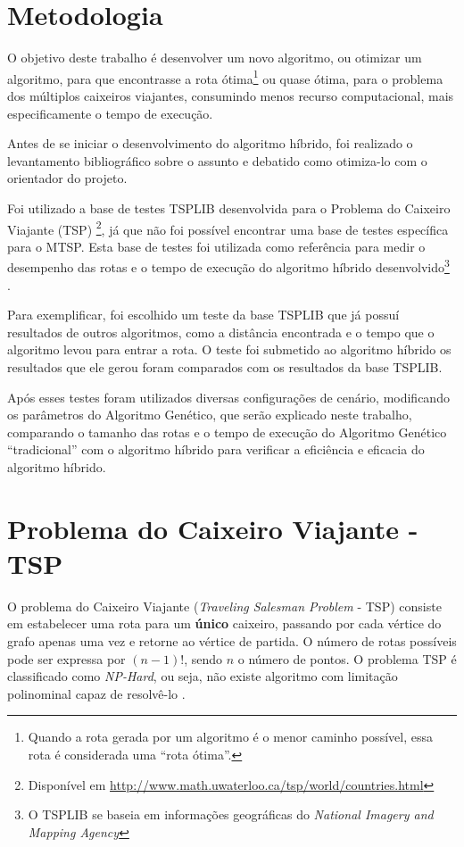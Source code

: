 \documentclass{abnt}
\begin{document}
	\chapter{Metodologia}

		O objetivo deste trabalho é desenvolver um novo algoritmo, ou otimizar um algoritmo, para que encontrasse a rota ótima\footnote{Quando a rota gerada por um algoritmo é o menor caminho possível, essa rota é considerada uma ``rota ótima''.} ou quase ótima, para o problema dos múltiplos caixeiros viajantes, consumindo menos recurso computacional, mais especificamente o tempo de execução. 

		Antes de se iniciar o desenvolvimento do algoritmo híbrido, foi realizado o levantamento bibliográfico sobre o assunto e debatido como otimiza-lo com o orientador do projeto.

		Foi utilizado a base de testes TSPLIB desenvolvida para o Problema do Caixeiro Viajante (TSP) \footnote{Disponível em \url{http://www.math.uwaterloo.ca/tsp/world/countries.html}}, já que não foi possível encontrar uma base de testes específica para o MTSP. Esta base de testes foi utilizada como referência para medir o desempenho das rotas e o tempo de execução do algoritmo híbrido desenvolvido\footnote{O TSPLIB se baseia em informações geográficas do \textit{National Imagery and Mapping Agency}} \cite{tsplib}.

		Para exemplificar, foi escolhido um teste da base TSPLIB que já possuí resultados de outros algoritmos, como a distância encontrada e o tempo que o algoritmo levou para entrar a rota. O teste foi submetido ao algoritmo híbrido os resultados que ele gerou foram comparados com os resultados da base TSPLIB.

		Após esses testes foram utilizados diversas configurações de cenário, modificando os parâmetros do Algoritmo Genético, que serão explicado neste trabalho, comparando o tamanho das rotas e o tempo de execução do Algoritmo Genético ``tradicional'' com o algoritmo híbrido para verificar a eficiência e eficacia do algoritmo híbrido. 

	
	\chapter{Problema do Caixeiro Viajante - TSP}
		O problema do Caixeiro Viajante (\textit{Traveling Salesman Problem} - TSP) consiste em estabelecer uma rota para um \textbf{único} caixeiro, passando por cada vértice do grafo apenas uma vez e retorne ao vértice de partida. O número de rotas possíveis pode ser expressa por $(n-1)!$, sendo $n$ o número de pontos.
		O problema TSP é classificado como \textit{NP-Hard}\cite{0015-pdf}, ou seja, não existe algoritmo com limitação polinominal capaz de resolvê-lo \cite{0010-pdf}. 
		
\end{document}
